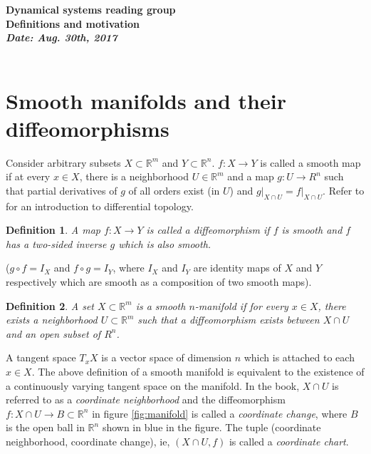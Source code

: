 \documentclass[11pt]{article}
\newtheorem{definition}{Definition}
\begin{document}
\begin{center}
{\large \bf	Dynamical systems reading group \\[1ex]
			Definitions and motivation
\\[2ex]
	   	{\it Date: Aug. 30th, 2017} \hfill \\[-1.5ex]	  
 	\hrulefill \\
				
}
\end{center}


\section*{Smooth manifolds and their diffeomorphisms}

Consider arbitrary subsets $X \subset \mathbb{R}^m$ and $Y \subset \mathbb{R}^n$. $f:X\to Y$ is called a smooth map if at every $x \in X$, there is a 
neighborhood $U \in \mathbb{R}^m$ and a map $g:U\to R^n$ such that 
partial derivatives of $g$ of all orders exist (in $U$) and $g\bigg|_{X \cap
U} = f\bigg|_{X \cap U}$. Refer to \cite{milnor,milnor2011} for an introduction 
to differential topology.

\begin{definition}
A map $f:X\to Y$ is called a diffeomorphism if $f$ is smooth and 
$f$ has a two-sided inverse $g$ which is also smooth.\end{definition} 

 ($g\circ f = I_X$
and $f\circ g = I_Y$, where $I_X$ and $I_Y$ are identity maps 
of $X$ and $Y$ respectively which are smooth as a composition of two smooth maps).

\begin{definition}
A set $X \subset \mathbb{R}^m$ is a smooth $n$-manifold if for every $x \in X$, there exists 
a neighborhood $U \subset \mathbb{R}^m$ such that a diffeomorphism exists
between $X \cap U$ and an open subset of $R^n$.
\end{definition} 

A tangent space $T_x X$ is a vector space of dimension $n$ which is attached to 
each $x \in X$. The above definition of a smooth manifold is equivalent to the existence of a
continuously varying tangent space on the manifold. In the book, $X \cap U$ is 
referred to as a \emph{coordinate neighborhood} and the diffeomorphism $f: X\cap U \to B \subset \mathbb{R}^n$
in figure \ref{fig:manifold} is called a \emph{coordinate change}, where $B$ is the open ball
in $\mathbb{R}^n$ shown in blue in the figure. The tuple (coordinate neighborhood, coordinate change), 
ie, $(X\cap U, f)$ is called a \emph{coordinate chart}.
\end{document}
